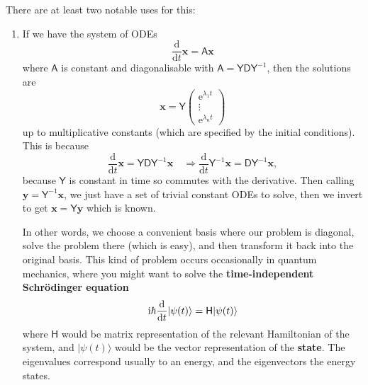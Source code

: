\documentclass[letter-paper]{tufte-book}
\newenvironment{example}[1][Example]{\begin{trivlist}
\item[\hskip \labelsep {\bfseries #1}]}{\end{trivlist}}
\newcommand{\ex}{\mathrm{e}}
\newcommand{\zi}{{\rm i}}
\newcommand{\As}{{\mathsf{A}}}
\newcommand{\Ds}{{\mathsf{D}}}
\newcommand{\Ys}{{\mathsf{Y}}}
\newcommand{\xb}{{\boldsymbol{x}}}
\newcommand{\yb}{{\boldsymbol{y}}}
\begin{document}
There are at least two notable uses for this:
\begin{example}
  \begin{enumerate}
    \item If we have the system of ODEs
    \begin{equation*}
      \frac{\mathrm{d}}{\mathrm{d}t}\xb = \As\xb
    \end{equation*}
    where $\As$ is constant and diagonalisable with $\As = \Ys \Ds \Ys^{-1}$,
    then the solutions are
    \begin{equation*}
      \xb = \Ys\begin{pmatrix}\ex^{\lambda_1 t} \\ \vdots \\ \ex^{\lambda_n t}\end{pmatrix}
    \end{equation*}
    up to multiplicative constants (which are specified by the initial
    conditions). This is because
    \begin{equation*}
      \frac{\mathrm{d}}{\mathrm{d}t}\xb = \Ys \Ds \Ys^{-1}\xb \quad \Rightarrow \frac{\mathrm{d}}{\mathrm{d}t} \Ys^{-1}\xb = \Ds\Ys^{-1}\xb,
    \end{equation*}
    because $\Ys$ is constant in time so commutes with the derivative. Then
    calling $\yb = \Ys^{-1}\xb$, we just have a set of trivial constant ODEs to
    solve, then we invert to get $\xb = \Ys\yb$ which is known. 
    
    In other words, we choose a convenient basis where our problem is diagonal,
    solve the problem there (which is easy), and then transform it back into the
    original basis. This kind of problem occurs occasionally in quantum
    mechanics, where you might want to solve the \textbf{time-independent
    Schr\"odinger equation}
    \begin{equation*}
      \zi\hbar\frac{\mathrm{d}}{\mathrm{d}t}|\psi(t)\rangle = \mathsf{H}|\psi(t)\rangle
    \end{equation*}
    where $\mathsf{H}$ would be matrix representation of the relevant
    Hamiltonian of the system, and $|\psi(t)\rangle$ would
    be the vector representation of the \textbf{state}. The eigenvalues
    correspond usually to an energy, and the eigenvectors the energy states.
    

\end{enumerate}
\end{example}
\end{document}
